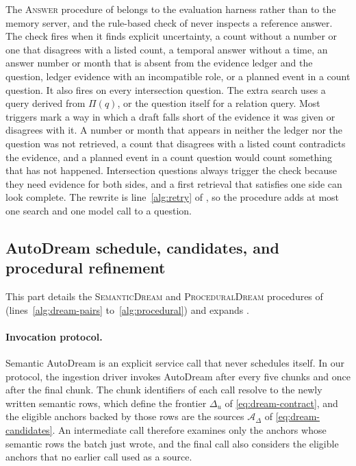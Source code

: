The \textsc{Answer} procedure of  belongs to the evaluation
harness rather than to the memory server, and the rule-based check of
 never inspects a reference answer. The check fires when it
finds explicit uncertainty, a count without a number or one that disagrees with
a listed count, a temporal answer without a time, an answer number or month that
is absent from the evidence ledger and the question, ledger evidence with an
incompatible role, or a planned event in a count question. It also fires on
every intersection question. The extra search uses a query derived from
\(\Pi(q)\), or the question itself for a relation query. Most triggers mark a
way in which a draft falls short of the evidence it was given or disagrees with
it. A number or month that appears in neither the ledger nor the question was
not retrieved, a count that disagrees with a listed count contradicts the
evidence, and a planned event in a count question would count something that has
not happened. Intersection questions always trigger the check because they need
evidence for both sides, and a first retrieval that satisfies one side can look
complete. The rewrite is line~\ref{alg:retry} of , so the
procedure adds at most one search and one model call to a question.

\subsection{AutoDream schedule, candidates, and procedural refinement}
\label{app:method-autodream}

This part details the \textsc{SemanticDream} and \textsc{ProceduralDream}
procedures of  (lines~\ref{alg:dream-pairs} to~\ref{alg:procedural}) and expands .

\paragraph{Invocation protocol.}
Semantic AutoDream is an explicit service call that never schedules itself. In
our protocol, the ingestion driver invokes AutoDream after every five chunks and
once after the final chunk. The chunk identifiers of each call resolve to the
newly written semantic rows, which define the frontier \(\Delta_u\) of
\eqref{eq:dream-contract}, and the eligible anchors backed by those rows are the
sources \(\mathcal A_\Delta\) of \eqref{eq:dream-candidates}. An intermediate
call therefore examines only the anchors whose semantic rows the batch just
wrote, and the final call also considers the eligible anchors that no earlier
call used as a source.

